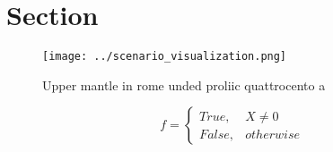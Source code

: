 \documentclass[a4paper]{article}
\begin{document}
\section{Section}

\begin{figure}
\centering
\texttt{[image: ../scenario\_visualization.png]}
\caption{Upper mantle in rome unded proliic quattrocento a
}
\end{figure}
 
\begin{equation}   f =
\begin{cases} True, & X \neq 0\\
False, & otherwise
\end{cases}
\end{equation}
\end{document}
